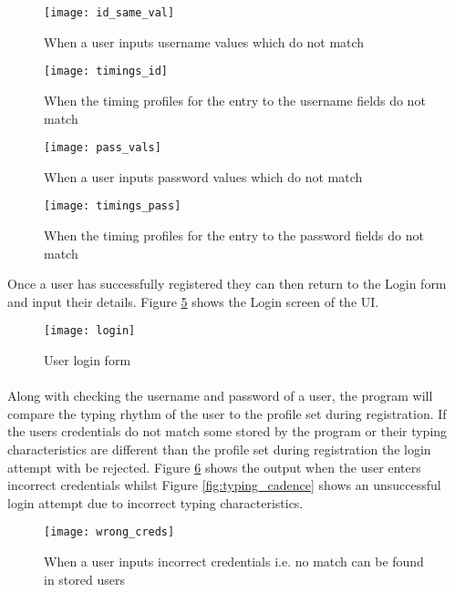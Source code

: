 \documentclass{article}
\begin{document}
\begin{figure}[H]
    \centering
    \texttt{[image: id\_same\_val]}
    \caption{When a user inputs username values which do not match}
    \label{fig:id_same_val}
\end{figure}

\begin{figure}[H]
    \centering
    \texttt{[image: timings\_id]}
    \caption{When the timing profiles for the entry to the username fields do not match}
    \label{fig:timings_id}
\end{figure}

\begin{figure}[H]
    \centering
    \texttt{[image: pass\_vals]}
    \caption{When a user inputs password values which do not match}
    \label{fig:pass_vals}
\end{figure}

\begin{figure}[H]
    \centering
    \texttt{[image: timings\_pass]}
    \caption{When the timing profiles for the entry to the password fields do not match}
    \label{fig:timings_pass}
\end{figure}

Once a user has successfully registered they can then return to the Login form and input their details. Figure \ref{fig:login} shows the Login screen of the UI. 

\begin{figure}[H]
    \centering
    \texttt{[image: login]}
    \caption{User login form}
    \label{fig:login}
\end{figure}

\paragraph{}
Along with checking the username and password of a user, the program will compare the typing rhythm of the user to  the profile set during registration. If the users credentials do not match some stored by the program or their typing characteristics are different than the profile set during registration the login attempt with be rejected. Figure \ref{fig:wrong_creds} shows the output when the user enters incorrect credentials whilst Figure \ref{fig:typing_cadence} shows an unsuccessful login attempt due to incorrect typing characteristics.


\begin{figure}[H]
    \centering
    \texttt{[image: wrong\_creds]}
    \caption{When a user inputs incorrect credentials i.e. no match can be found in stored users}
    \label{fig:wrong_creds}
\end{figure}
\end{document}
